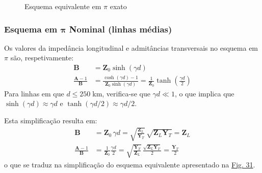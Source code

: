 \vspace{-1.25em}
\begin{figure}[H]
    \centering
    \caption{Esquema equivalente em $\pi$ exato}
    \label{fig:linha-transmissao-esq-exato}
\end{figure}

\subsubsection{Esquema em $\pmb{\pi}$ Nominal (linhas médias)}

Os valores da impedância longitudinal e admitâncias transversais no esquema em $\pi$ são, respetivamente:
$$
    \begin{aligned}
        \mathbf{B} &= \mathbf{Z}_0 \sinh(\gamma d) \\[1pt]
        \frac{\mathbf{A}-1}{\mathbf{B}} &= \frac{\cosh(\gamma d)-1}{\mathbf{Z}_0 \sinh(\gamma d)} = \frac{1}{\mathbf{Z}_0} \tanh\left(\frac{\gamma d}{2}\right)
    \end{aligned}
$$
Para linhas em que $d \le 250\;$km, verifica-se que $\gamma d \ll 1$, o que implica que $\sinh(\gamma d) \approx \gamma d$ e $\tanh(\gamma d/2) \approx \gamma d/2$.

Esta simplificação resulta em:
$$
    \begin{aligned}
        \mathbf{B} &= \mathbf{Z}_0\, \gamma d = \sqrt{\frac{\mathbf{Z}_L}{\mathbf{Y}_T}}\, \sqrt{\mathbf{Z}_L \mathbf{Y}_T} = \mathbf{Z}_L \\[1pt]
        \frac{\mathbf{A}-1}{\mathbf{B}} &= \frac{1}{\mathbf{Z}_0} \frac{\gamma d}{2} = \sqrt{\frac{\mathbf{Y}_T}{\mathbf{Z}_L}}\, \frac{\sqrt{\mathbf{Z}_L \mathbf{Y}_T}}{2} = \frac{\mathbf{Y}_T}{2}
    \end{aligned}%
$$
o que se traduz na simplificação do esquema equivalente apresentado na \hyperref[fig:linha-transmissao-esq-nominal]{Fig. 31}.

